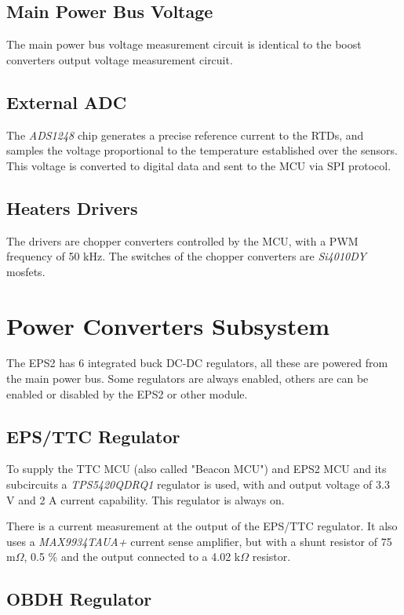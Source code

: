 \subsection{Main Power Bus Voltage}

The main power bus voltage measurement circuit is identical to the boost converters output voltage measurement circuit.

\subsection{External ADC}

The \textit{ADS1248} chip generates a precise reference current to the RTDs, and samples the voltage proportional to the temperature established over the sensors. This voltage is converted to digital data and sent to the MCU via SPI protocol.

\subsection{Heaters Drivers}

The drivers are chopper converters controlled by the MCU, with a PWM frequency of 50 kHz. The switches of the chopper converters are \textit{Si4010DY} mosfets.

\section{Power Converters Subsystem}

The EPS2 has 6 integrated buck DC-DC regulators, all these are powered from the main power bus. Some regulators are always enabled, others are can be enabled or disabled by the EPS2 or other module.

\subsection{EPS/TTC Regulator}

To supply the TTC MCU (also called "Beacon MCU") and EPS2 MCU and its subcircuits a \textit{TPS5420QDRQ1} regulator is used, with and output voltage of 3.3 V and 2 A current capability. This regulator is always on.

There is a current measurement at the output of the EPS/TTC regulator. It also uses a \textit{MAX9934TAUA+} current sense amplifier, but with a shunt resistor of 75 m$\Omega$, 0.5 \% and the output connected to a 4.02 k$\Omega$ resistor.

\subsection{OBDH Regulator}

